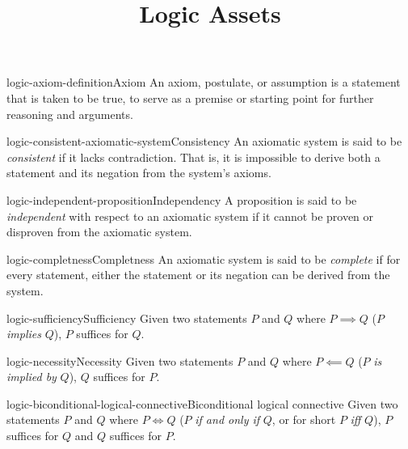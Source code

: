 \documentclass[preview]{standalone}
\begin{document}
\title{Logic Assets}

\begin{snippet}{logic-axiom-definition}{Axiom}
    An axiom, postulate, or assumption is a statement that is taken to be true, to serve as a premise or starting point for further reasoning and arguments.
\end{snippet}

\begin{snippetdefinition}{logic-consistent-axiomatic-system}{Consistency}{
    An axiomatic system is said to be \textit{consistent} if it lacks contradiction.
    That is, it is impossible to derive both a statement and its negation from the system's axioms.
}
\end{snippetdefinition}

\begin{snippetdefinition}{logic-independent-proposition}{Independency}{
    A proposition is said to be \textit{independent} with respect to an axiomatic system
    if it cannot be proven or disproven from the axiomatic system.
}
\end{snippetdefinition}

\begin{snippetdefinition}{logic-completness}{Completness}{
    An axiomatic system is said to be \textit{complete} if for every statement,
    either the statement or its negation can be derived from the system.
}
\end{snippetdefinition}

\begin{snippetdefinition}{logic-sufficiency}{Sufficiency}{
    Given two statements \(P\) and \(Q\) where \(P \implies Q\) (\(P\) \textit{implies} \(Q\)),
    \(P\) suffices for \(Q\).
}
\end{snippetdefinition}

\begin{snippetdefinition}{logic-necessity}{Necessity}{
    Given two statements \(P\) and \(Q\) where \(P \impliedby Q\) (\(P\) \textit{is implied by} \(Q\)),
    \(Q\) suffices for \(P\).
}
\end{snippetdefinition}

\begin{snippetdefinition}{logic-biconditional-logical-connective}{Biconditional logical connective}{
    Given two statements \(P\) and \(Q\) where \(P \iff Q\)
    (\(P\) \textit{if and only if} \(Q\), or for short \(P\) \textit{iff} \(Q\)),
    \(P\) suffices for \(Q\) and \(Q\) suffices for \(P\).
}
\end{snippetdefinition}
\end{document}
